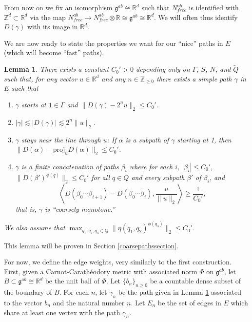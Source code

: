 \documentclass[12pt,reqno]{article}
\numberwithin{equation}{section}
\newcommand{\R}{\mathbb{R}}
\newcommand{\Z}{\mathbb{Z}}
\newcommand{\pair}[2]{\left\langle #1, #2 \right\rangle}
\newcommand{\proj}{\mathrm{proj}}
\newcommand{\g}{\mathfrak{g}}
\newtheorem{lemma}{Lemma}
\begin{document}
From now on we fix an isomorphism $\g^{ab} \cong \R^{d}$ such that $N^{ab}_{free}$ is identified with $\Z^d \subset \R^{d}$
via the map $N^{ab}_{free} \to N^{ab}_{free} \otimes \R \cong \g^{ab} \cong \R^d$. We will often thus identify $D(\gamma)$
with its image in $\R^d$.

We are now ready to state the properties we want for our ``nice'' paths in $E$ (which will become ``fast'' paths).
\begin{lemma} \label{coarsepaths}
   There exists a constant $C_0' > 0$ depending only on $\Gamma$, $S$, $N$, and $\tilde{Q}$ such that, for any vector $u \in \R^d$ and
   any $n \in \Z_{\ge 0}$ there exists a simple path $\gamma$ in $E$ such that 
   \begin{enumerate}
      \item $\gamma$ starts at $1 \in \Gamma$ and $\| D(\gamma) - 2^n u \|_2 \le C_0'$.
      \item $|\gamma| \lesssim |D(\gamma)| \lesssim 2^n \|u\|_2$.
      \item $\gamma$ stays near the line through $u$: 
               If $\alpha$ is a subpath of $\gamma$ starting at 1, then $\| D(\alpha) - \proj_u D(\alpha) \|_2 \le C_0'$.
      \item $\gamma$ is a finite concatenation of paths $\beta_i$ where for each $i$, $|\beta_i| \le C_0'$, 
               $\| D(\beta')^{\phi(q)} \|_2 \le C_0'$ for all $q \in Q$ and every subpath $\beta'$ of $\beta_i$, and 
               \[\pair{ D(\beta_0 \cdots \beta_{i+1}) - D(\beta_0 \cdots \beta_i) }{ \frac{u}{\|u\|_2} } \ge  \frac{1}{C_0'},\]
               that is, $\gamma$ is ``coarsely monotone.''
   \end{enumerate}
   We also assume that $\max_{q_1,q_2,q_3 \in Q} \|\eta(q_1,q_2)^{\phi(q_3)}\|_2 \le C_0'$.
\end{lemma}
This lemma will be proven in Section \ref{coarsepathssection}.

For now, we define the edge weights, very similarly to the first construction. First, given a Carnot-Carath\'eodory metric with associated
norm $\Phi$ on $\g^{ab}$, let $B \subset \g^{ab} \cong \R^d$ be the unit ball of $\Phi$. Let $\{ b_n \}_{n \ge 0}$ be a countable
dense subset of the boundary of $B$. For each $n$, let $\gamma_n$ be the path given in Lemma \ref{coarsepaths} associated to 
the vector $b_n$ and the natural number $n$. Let $E_n$ be the set of edges in $E$ which share at least one vertex with the path $\gamma_n$.
\end{document}
